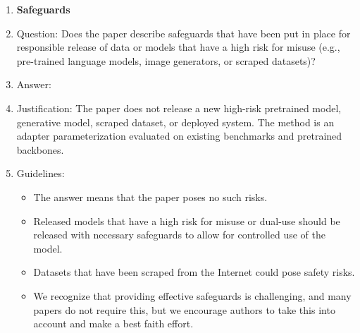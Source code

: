 \begin{enumerate}
\item {\bf Safeguards}
    \item[] Question: Does the paper describe safeguards that have been put in place for responsible release of data or models that have a high risk for misuse (e.g., pre-trained language models, image generators, or scraped datasets)?
    \item[] Answer: \answerNA{}
    \item[] Justification: The paper does not release a new high-risk pretrained model, generative model, scraped dataset, or deployed system. The method is an adapter parameterization evaluated on existing benchmarks and pretrained backbones.
    \item[] Guidelines:
    \begin{itemize}
        \item The answer \answerNA{} means that the paper poses no such risks.
        \item Released models that have a high risk for misuse or dual-use should be released with necessary safeguards to allow for controlled use of the model.
        \item Datasets that have been scraped from the Internet could pose safety risks.
        \item We recognize that providing effective safeguards is challenging, and many papers do not require this, but we encourage authors to take this into account and make a best faith effort.
    \end{itemize}


\end{enumerate}

